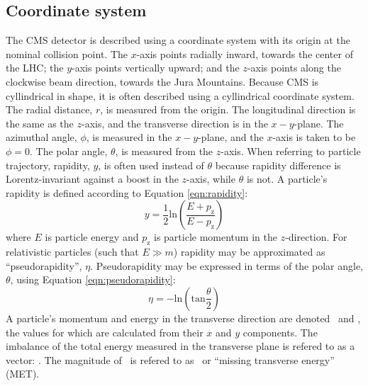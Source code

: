 \subsection{Coordinate system}
\label{sec:coordinates}

The CMS detector is described using a coordinate
system with its origin at the nominal collision point.
The $x$-axis points radially inward, towards the center of the LHC;
the $y$-axis points vertically upward; and 
the $z$-axis points along the clockwise beam direction, towards the Jura Mountains.
Because CMS is cyllindrical in shape, it is often described using a cyllindrical
coordinate system.  
The radial distance, $r$, is measured from the origin.
The longitudinal direction is the same as the $z$-axis, and the transverse direction is in the $x-y$-plane.
The azimuthal angle, $\phi$, is measured in the $x-y$-plane, and the $x$-axis is taken to be $\phi = 0$.
The polar angle, $\theta$, is measured from the $z$-axis.  When referring to particle trajectory, rapidity, $y$, is often
used instead of $\theta$ because rapidity difference is Lorentz-invariant against a boost in the $z$-axis, while
$\theta$ is not.  A particle's rapidity is defined according to Equation \ref{eqn:rapidity}:
\begin{equation}
  y = \frac{1}{2}\text{ln}\left(\frac{E+p_{\text{z}}}{E-p_{\text{z}}}\right)
  \label{eqn:rapidity}
\end{equation}
where $E$ is particle energy and $p_{\text{z}}$ is particle momentum in the $z$-direction.
For relativistic particles (such that $E \gg m$) rapidity may be approximated as ``pseudorapidity'', $\eta$.
Pseudorapidity may be expressed in terms of the polar angle, $\theta$, using Equation \ref{eqn:pseudorapidity}:
\begin{equation}
  \eta = -\text{ln}\left(\text{tan}\frac{\theta}{2}\right)
  \label{eqn:pseudorapidity}
\end{equation}
A particle's momentum and energy in the transverse direction are denoted \pt~and \et, 
the values for which are calculated from their $x$ and $y$ components.
The imbalance of the total energy measured in the transverse plane is refered to
as a vector: \metvec.  The magnitude of \metvec~is refered to as \met~or ``missing transverse energy'' (MET).
